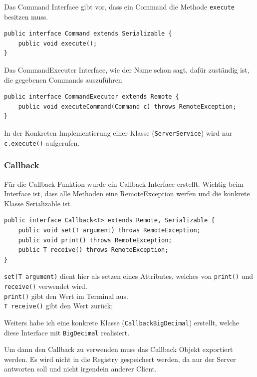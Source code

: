 Das Command Interface gibt vor, dass ein Command die Methode \texttt{execute} besitzen muss.

\begin{lstlisting}[style=Java, caption=Command Interface]
public interface Command extends Serializable {
  	public void execute();
}
\end{lstlisting}

Das CommandExecuter Interface, wie der Name schon sagt, daf\"ur zust\"andig ist, die gegebenen Commands auszuf\"uhren

\begin{lstlisting}[style=Java, caption=CommandExecuter Interface]
public interface CommandExecutor extends Remote {
    public void executeCommand(Command c) throws RemoteException;
}
\end{lstlisting}

In der Konkreten Implementierung einer Klasse (\texttt{ServerService}) wird nur \texttt{c.execute()} aufgerufen.

\subsubsection{Callback}

F\"ur die Callback Funktion wurde ein Callback Interface erstellt.
Wichtig beim Interface ist, dass alle Methoden eine RemoteException werfen und die konkrete Klasse Serializable ist.

\begin{lstlisting}[style=Java, caption=Callback Interface]
public interface Callback<T> extends Remote, Serializable {
    public void set(T argument) throws RemoteException;
    public void print() throws RemoteException;
    public T receive() throws RemoteException;
}
\end{lstlisting}

\texttt{set(T argument)} dient hier als setzen eines Attributes, welches von \texttt{print()} und \texttt{receive()} verwendet wird. \\
\texttt{print()} gibt den Wert im Terminal aus.\\
\texttt{T receive()} gibt den Wert zur\"uck;

Weiters habe ich eine konkrete Klasse (\texttt{CallbackBigDecimal}) erstellt, welche diese Interface mit \texttt{BigDecimal} realisiert.

Um dann den Callback zu verwenden muss das Callback Objekt exportiert werden.
Es wird nicht in die Registry gespeichert werden, da nur der Server antworten soll und nicht irgendein anderer Client.

